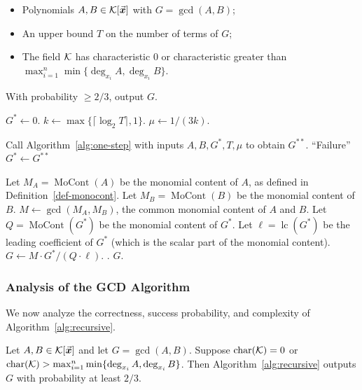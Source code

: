\documentclass{article}
\numberwithin{equation}{section}
\begin{document}
\begin{algorithm}
\caption{GCD Algorithm}
\label{alg:recursive}
\begin{algorithmic}[1]
\Require
    \begin{itemize}
        \item Polynomials $A, B \in {\mathcal{K}}[\vec{\boldsymbol{x}}]$ with $G = \gcd(A,B)$;
        \item An upper bound $T$ on the number of terms of $G$;
        \item The field ${\mathcal{K}}$ has characteristic $0$ or characteristic greater than $\max_{i=1}^n\min\{\deg_{x_i} A,\deg_{x_i} B\}$.
    \end{itemize}
\Ensure
    With probability $\ge 2/3$, output $G$.

\State $G^* \gets 0$.
\State $k \gets \max\{\lceil \log_2 T \rceil,1\}$.
\State $\mu \gets 1/(3k)$.

    \State Call Algorithm~\ref{alg:one-step} with inputs $A, B, G^*, T, \mu$ to obtain $G^{**}$.
        \State \Return ``Failure''
    \Else
        \State $G^* \gets G^{**}$
    \EndIf
\EndFor

\State Let $M_A = \operatorname{MoCont}(A)$ be the monomial content of $A$, as defined in Definition~\ref{def-monocont}.
\State Let $M_B = \operatorname{MoCont}(B)$ be the monomial content of $B$.
\State $M \gets \gcd(M_A, M_B)$, the common monomial content of $A$ and $B$.
\State Let $Q = \operatorname{MoCont}(G^*)$ be the monomial content of $G^*$.
\State Let $\ell = \operatorname{lc}(G^*)$ be the leading coefficient of $G^*$ (which is the scalar part of the monomial content).
\State $G \gets M \cdot G^* / (Q \cdot \ell)$.
.
\State \Return $G$.
\end{algorithmic}
\end{algorithm}


\subsubsection*{Analysis of the GCD Algorithm}

We now analyze the correctness, success probability, and complexity of Algorithm~\ref{alg:recursive}.

\begin{theorem}\label{thm:recursive}
Let $A, B \in {\mathcal{K}}[\vec{\boldsymbol{x}}]$ and let $G = \gcd(A,B)$. Suppose $\operatorname{char}({\mathcal{K}}) = 0$ or $\operatorname{char}({\mathcal{K}}) > \max_{i=1}^n\min\{\deg_{x_i} A,\deg_{x_i} B\}$. Then Algorithm~\ref{alg:recursive} outputs $G$ with probability at least $2/3$.
\end{theorem}
\end{document}
